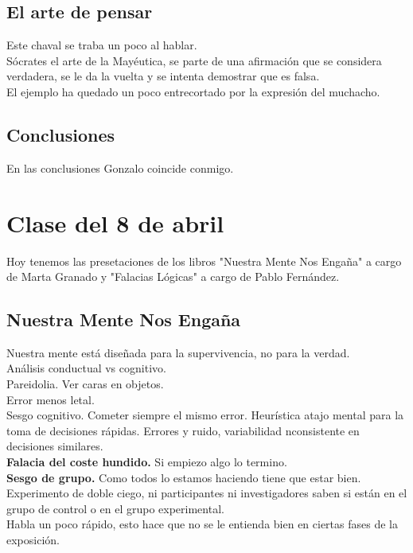 \documentclass[12pt, a4paper, twoside]{article}
\begin{document}
\subsection{El arte de pensar}
Este chaval se traba un poco al hablar.\\
Sócrates el arte de la Mayéutica, se parte de una afirmación que se considera verdadera,
se le da la vuelta y se intenta demostrar que es falsa.\\
El ejemplo ha quedado un poco entrecortado por la expresión del muchacho.\\

\subsection{Conclusiones}
En las conclusiones Gonzalo coincide conmigo.\\

\section{Clase del 8 de abril}
Hoy tenemos las presetaciones de los libros "Nuestra Mente Nos Engaña" a cargo de 
Marta Granado y "Falacias Lógicas" a cargo de Pablo Fernández.\\
\subsection{Nuestra Mente Nos Engaña}
Nuestra mente está diseñada para la supervivencia, no para la verdad.\\
Análisis conductual vs cognitivo.\\
Pareidolia. Ver caras en objetos.\\
Error menos letal.\\
Sesgo cognitivo. Cometer siempre el mismo error. Heurística atajo mental para la 
toma de decisiones rápidas. Errores y ruido, variabilidad nconsistente en decisiones
similares.\\
\textbf{Falacia del coste hundido.} Si empiezo algo lo termino.\\
\textbf{Sesgo de grupo.} Como todos lo estamos haciendo tiene que estar bien.\\

Experimento de doble ciego, ni participantes ni investigadores saben si están en el grupo 
de control o en el grupo experimental.\\




Habla un poco rápido, esto hace que no se le entienda bien en ciertas fases de la exposición.\\
\end{document}
